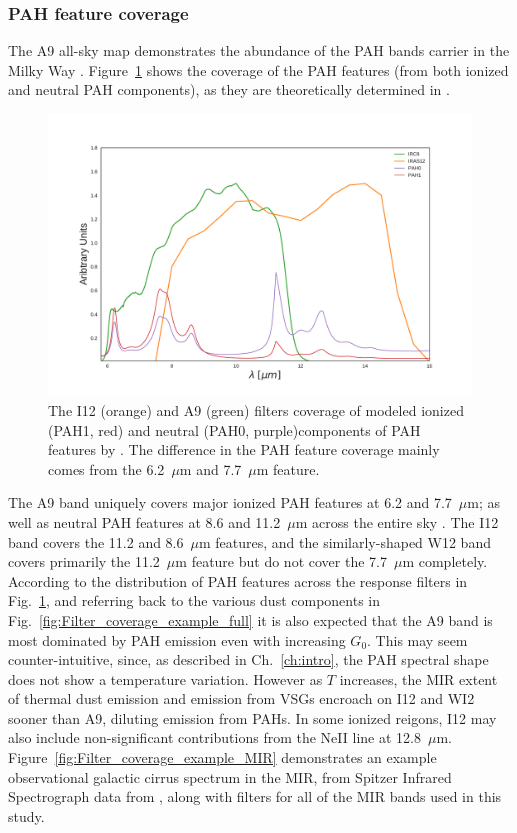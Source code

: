        \subsubsection{PAH feature coverage}
         The A9 all-sky map demonstrates the abundance of the PAH bands carrier in the Milky Way \citep{ishihara10}. Figure~\ref{fig:Filter_coverage_example_PAH} shows the coverage of the PAH features (from both ionized and neutral PAH components), as they are theoretically determined in \cite{dustem11}.
            \begin{figure}
              \centering
              \includegraphics[width=\textwidth]{../Plots/ch_datasources/Filter_coverage_example_PAH.pdf}
              \caption{The I12 (orange) and A9 (green) filters coverage of modeled ionized (PAH1, red) and neutral (PAH0, purple)components of PAH features by \cite{dustem11}. The difference in the PAH feature coverage mainly comes from the 6.2~$\mu$m and 7.7~$\mu$m feature.}
              \label{fig:Filter_coverage_example_PAH}
            \end{figure}
         The A9 band uniquely covers major ionized PAH features at 6.2 and 7.7~$\mu$m; as well as neutral PAH features at 8.6 and 11.2~$\mu$m across the entire sky \citep{irc07}. The I12 band covers the 11.2 and 8.6~$\mu$m features, and the similarly-shaped W12 band covers primarily the 11.2~$\mu{}$m feature but do not cover the 7.7~$\mu{}$m completely. According to the distribution of PAH features across the response filters in Fig.~\ref{fig:Filter_coverage_example_PAH}, and referring back to the various dust components in Fig.~\ref{fig:Filter_coverage_example_full} it is also expected that the A9 band is most dominated by PAH emission even with increasing $G_{0}$. This may seem counter-intuitive, since, as described in Ch.~\ref{ch:intro}, the PAH spectral shape does not show a temperature variation. However as $T$ increases, the MIR extent of thermal dust emission and emission from VSGs encroach on I12 and WI2 sooner than A9, diluting emission from PAHs. In some ionized reigons, I12 may also include non-significant contributions from the NeII line at 12.8~$\mu$m. Figure~\ref{fig:Filter_coverage_example_MIR} demonstrates an example observational galactic cirrus spectrum in the MIR, from Spitzer Infrared Spectrograph \citep{spitzer04} data from \cite{...}, along with filters for all of the MIR bands used in this study.
